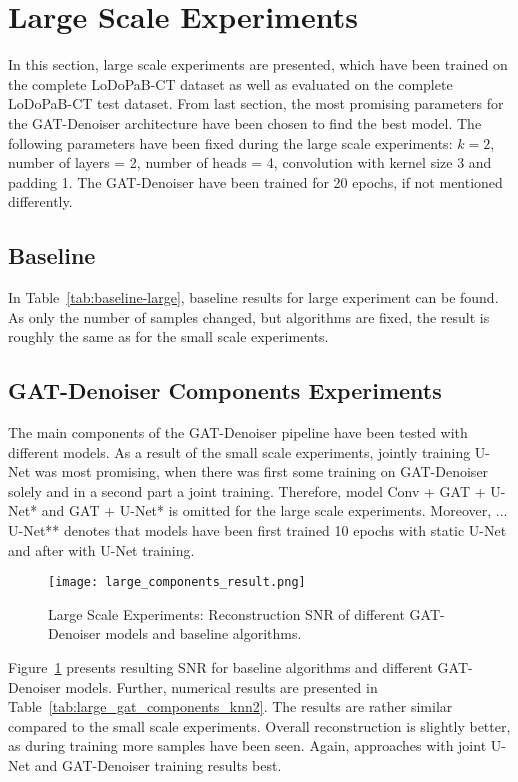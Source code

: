 \section{Large Scale Experiments}

In this section, large scale experiments are presented, which have been trained on the complete LoDoPaB-CT dataset
as well as evaluated on the complete LoDoPaB-CT test dataset.
From last section, the most promising parameters for the GAT-Denoiser architecture have been chosen
to find the best model. The following parameters have been fixed during the large scale experiments:
$k=2$, number of layers = 2, number of heads = 4, convolution with kernel size 3 and padding 1.
The GAT-Denoiser have been trained for 20 epochs, if not mentioned differently.


\subsection{Baseline}
In Table~\ref{tab:baseline-large}, baseline results for large experiment can be found.
As only the number of samples changed, but algorithms are fixed, the result is roughly 
the same as for the small scale experiments.

\subsection{GAT-Denoiser Components Experiments}
The main components of the GAT-Denoiser pipeline have been tested with different models.
As a result of the small scale experiments, jointly training U-Net was most promising, 
when there was first some training on GAT-Denoiser solely and in a second part a joint training.
Therefore, model {Conv + GAT + U-Net*} and {GAT + U-Net*} is omitted for the large scale experiments.
Moreover, {... U-Net**} denotes that models have been first trained 10 epochs with
static U-Net and after with U-Net training.


\begin{figure}[H]
  \centering
  \texttt{[image: large\_components\_result.png]}
  \caption{Large Scale Experiments: Reconstruction SNR of different GAT-Denoiser models and baseline algorithms.}
  \label{fig:large_components}
\end{figure}

Figure~\ref{fig:large_components} presents resulting SNR for baseline algorithms and 
different GAT-Denoiser models. Further, numerical results are presented in Table~\ref{tab:large_gat_components_knn2}.
The results are rather similar compared to the small scale experiments.
Overall reconstruction is slightly better, as during training more samples have been seen.
Again, approaches with joint U-Net and GAT-Denoiser training results best.

